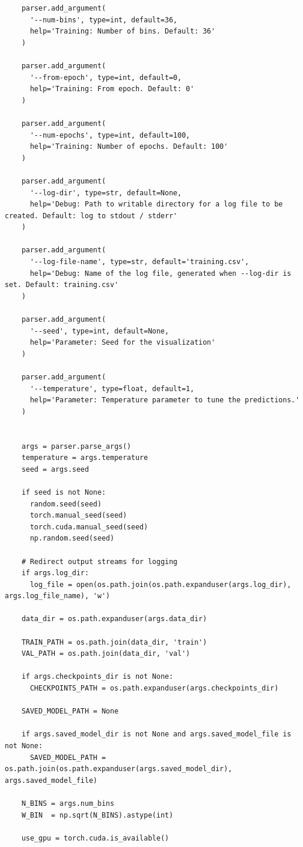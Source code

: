 \begin{longlisting}
\begin{verbatim}
    parser.add_argument(
      '--num-bins', type=int, default=36,
      help='Training: Number of bins. Default: 36'
    )

    parser.add_argument(
      '--from-epoch', type=int, default=0,
      help='Training: From epoch. Default: 0'
    )

    parser.add_argument(
      '--num-epochs', type=int, default=100,
      help='Training: Number of epochs. Default: 100'
    )

    parser.add_argument(
      '--log-dir', type=str, default=None,
      help='Debug: Path to writable directory for a log file to be created. Default: log to stdout / stderr'
    )

    parser.add_argument(
      '--log-file-name', type=str, default='training.csv',
      help='Debug: Name of the log file, generated when --log-dir is set. Default: training.csv'
    )

    parser.add_argument(
      '--seed', type=int, default=None,
      help='Parameter: Seed for the visualization'
    )

    parser.add_argument(
      '--temperature', type=float, default=1,
      help='Parameter: Temperature parameter to tune the predictions.'
    )


    args = parser.parse_args()
    temperature = args.temperature
    seed = args.seed

    if seed is not None:
      random.seed(seed)
      torch.manual_seed(seed)
      torch.cuda.manual_seed(seed)
      np.random.seed(seed)

    # Redirect output streams for logging
    if args.log_dir:
      log_file = open(os.path.join(os.path.expanduser(args.log_dir), args.log_file_name), 'w')

    data_dir = os.path.expanduser(args.data_dir)

    TRAIN_PATH = os.path.join(data_dir, 'train')
    VAL_PATH = os.path.join(data_dir, 'val')

    if args.checkpoints_dir is not None:
      CHECKPOINTS_PATH = os.path.expanduser(args.checkpoints_dir)

    SAVED_MODEL_PATH = None

    if args.saved_model_dir is not None and args.saved_model_file is not None:
      SAVED_MODEL_PATH = os.path.join(os.path.expanduser(args.saved_model_dir), args.saved_model_file)

    N_BINS = args.num_bins
    W_BIN  = np.sqrt(N_BINS).astype(int)

    use_gpu = torch.cuda.is_available()


\end{verbatim}
\end{longlisting}
